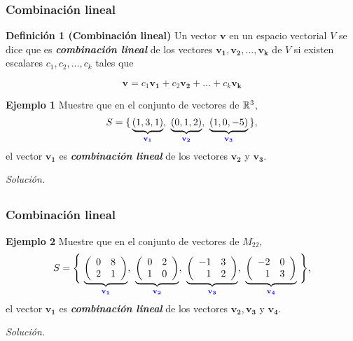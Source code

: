 \begin{frame}\frametitle{Combinación lineal}

\begin{block}{\textbf{Definición 1 (Combinación lineal)}}
	\justifying
	Un vector $\mathbf{v}$ en un espacio vectorial $V$ se dice que es \textbf{\textit{combinación lineal}} 
	de los vectores $\mathbf{v_1}, \mathbf{v_2}, \hdots, \mathbf{v_k}$ de $V$ si existen escalares $c_1,c_2, \hdots,c_k$ tales que
	
	\vspace{-2mm}
	\[
	\mathbf{v} = c_1\mathbf{v_1} + c_2\mathbf{v_2} + \hdots + c_k\mathbf{v_k}
	\]
\end{block}

\begin{ej}{\textbf{Ejemplo 1 }} \justifying
	Muestre que en el conjunto de vectores de $\mathbb{R}^3$,
	\[
	S = \{ \, \underbrace{(1,3,1)}_{\color{blue}\mathbf{v_1}}, \ \underbrace{(0,1,2)}_{\color{blue}\mathbf{v_2}}, \ 
	\underbrace{(1,0,-5)}_{\color{blue}\mathbf{v_3}} \, \},
	\]
	el vector $\mathbf{v_1}$ es \textbf{\textit{combinación lineal}} de los vectores $\mathbf{v_2}$ y $\mathbf{v_3}$.
\end{ej}	

\textit{Solución.}

\end{frame}


\subsection{}

\begin{frame}\frametitle{Combinación lineal}

\begin{ej}{\textbf{Ejemplo 2}} \justifying
	Muestre que en el conjunto de vectores de $M_{22}$,
	\[
	S = \Bigg\{ \, \underbrace{ \left( \begin{array}{cc}	0 & 8 \\ 2 & 1 \end{array} \right) }_{\color{blue}\mathbf{v_1}}, \ \underbrace{  \left( \begin{array}{cc}	0 & 2 \\ 1 & 0 \end{array} \right) }_{\color{blue}\mathbf{v_2}}, \ 
	\underbrace{ \left( \begin{array}{rr}  -1 & 3 \\ 1 & 2 \end{array} \right) }_{\color{blue}\mathbf{v_3}}, \ 
	\underbrace{ \left( \begin{array}{rr}  -2 & 0 \\ 1 & 3 \end{array} \right) }_{\color{blue}\mathbf{v_4}} \, \Bigg\},
	\]
	el vector $\mathbf{v_1}$ es \textbf{\textit{combinación lineal}} de los vectores $\mathbf{v_2},\mathbf{v_3}$ y $\mathbf{v_4}$.
\end{ej}	

\textit{Solución.}

\end{frame}

